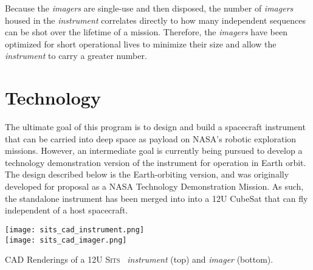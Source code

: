 \documentclass{tufte-handout}
\newcommand{\sitsshort}[0]{\textsc{Sits}}%
\begin{document}
Because the \textit{imagers} are single-use and then disposed, the number of 
\textit{imagers} housed in the \textit{instrument} correlates directly to how many independent
sequences can be shot over the lifetime of a mission. Therefore, the \textit{imagers} have
been optimized for short operational lives to minimize their size and
allow the \textit{instrument} to carry a greater number. 


\section{Technology}\label{sec:tech}


The ultimate goal of this program is to design and build a spacecraft 
instrument that can be carried into deep space as payload on NASA's robotic 
exploration missions. However, an intermediate goal is currently being 
pursued to develop a technology demonstration version of the instrument for 
operation in Earth orbit. The design described below is the Earth-orbiting 
version, and was originally developed for proposal as a NASA Technology 
Demonstration Mission. As such, the standalone instrument has been merged into
into a 12U CubeSat that can fly independent of a host spacecraft. 

\begin{marginfigure}[0 in]%
  \texttt{[image: sits\_cad\_instrument.png]}\\
  \texttt{[image: sits\_cad\_imager.png]}
  \caption{CAD Renderings of a 12U \sitsshort~ \textit{instrument} (top) 
           and \textit{imager} (bottom).}
  \label{fig:sitscad}
\end{marginfigure}
\end{document}

